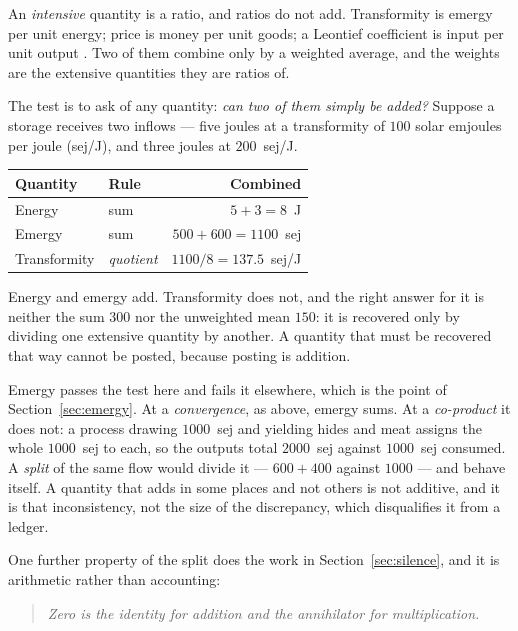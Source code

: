 \documentclass[11pt,a4paper]{article}
\begin{document}
An \emph{intensive} quantity is a ratio, and ratios do not add. Transformity is emergy per unit energy; price is money per unit goods; a Leontief coefficient is input per unit output \citep{odum1996}. Two of them combine only by a weighted average, and the weights are the extensive quantities they are ratios of.

The test is to ask of any quantity: \emph{can two of them simply be added?} Suppose a storage receives two inflows --- five joules at a transformity of $100$ solar emjoules per joule (sej/J), and three joules at $200$~sej/J.

\begin{center}
\begin{tabular}{llr}
\toprule
Quantity & Rule & Combined \\
\midrule
Energy       & sum                       & $5 + 3 = 8$~J \\
Emergy       & sum                       & $500 + 600 = 1100$~sej \\
Transformity & \emph{quotient} & $1100 / 8 = 137.5$~sej/J \\
\bottomrule
\end{tabular}
\end{center}

Energy and emergy add. Transformity does not, and the right answer for it is neither the sum $300$ nor the unweighted mean $150$: it is recovered only by dividing one extensive quantity by another. A quantity that must be recovered that way cannot be posted, because posting is addition.

Emergy passes the test here and fails it elsewhere, which is the point of Section~\ref{sec:emergy}. At a \emph{convergence}, as above, emergy sums. At a \emph{co-product} it does not: a process drawing $1000$~sej and yielding hides and meat assigns the whole $1000$~sej to each, so the outputs total $2000$~sej against $1000$~sej consumed. A \emph{split} of the same flow would divide it --- $600 + 400$ against $1000$ --- and behave itself. A quantity that adds in some places and not others is not additive, and it is that inconsistency, not the size of the discrepancy, which disqualifies it from a ledger.

One further property of the split does the work in Section~\ref{sec:silence}, and it is arithmetic rather than accounting:

\begin{quote}
\emph{Zero is the identity for addition and the annihilator for multiplication.}
\end{quote}
\end{document}
